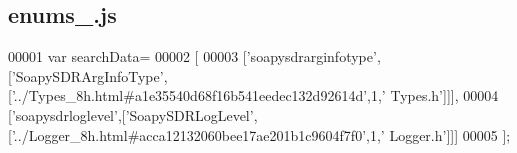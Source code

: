 \subsection{enums\+\_.\+js}
\label{enums__1_8js_source}

\begin{DoxyCode}
00001 var searchData=
00002 [
00003   [\textcolor{stringliteral}{'soapysdrarginfotype'},[\textcolor{stringliteral}{'SoapySDRArgInfoType'},[\textcolor{stringliteral}{'../Types\_8h.html#a1e35540d68f16b541eedec132d92614d'},1,\textcolor{stringliteral}{'
      Types.h'}]]],
00004   [\textcolor{stringliteral}{'soapysdrloglevel'},[\textcolor{stringliteral}{'SoapySDRLogLevel'},[\textcolor{stringliteral}{'../Logger\_8h.html#acca12132060bee17ae201b1c9604f7f0'},1,\textcolor{stringliteral}{'
      Logger.h'}]]]
00005 ];
\end{DoxyCode}
